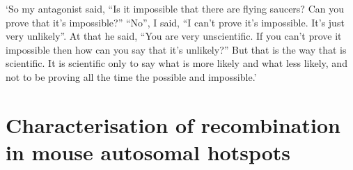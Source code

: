 \begin{savequote}[8cm]
	
	‘So my antagonist said, “Is it impossible that there are flying saucers? Can you prove that it's impossible?” “No”, I said, “I can't prove it's impossible. It's just very unlikely”. At that he said, “You are very unscientific. If you can't prove it impossible then how can you say that it's unlikely?” But that is the way that is scientific. It is scientific only to say what is more likely and what less likely, and not to be proving all the time the possible and impossible.’
	
	
\end{savequote}

\chapter{\label{ch:6-recombination-parameters}Characterisation of recombination in mouse autosomal hotspots}


\minitoc{}

